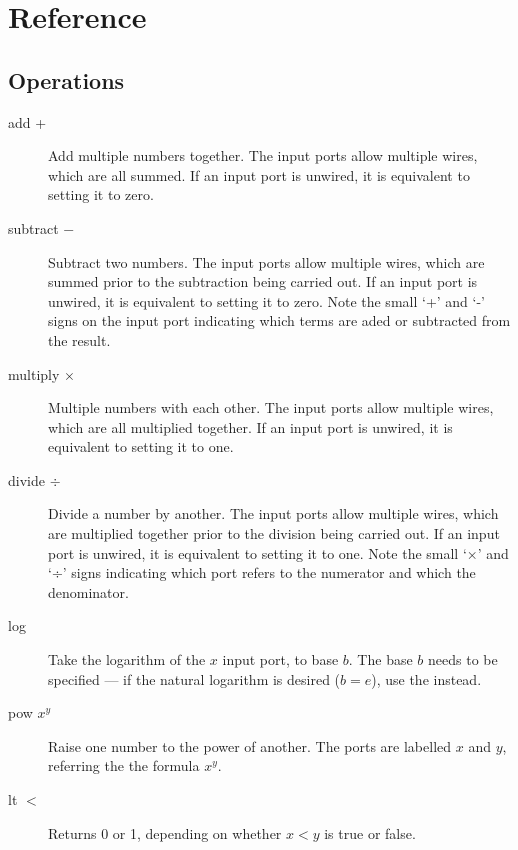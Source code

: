 \chapter{Reference}

\section{Operations}\label{operations}

\begin{description}

\item[add +]\label{op:add} Add multiple numbers together. The input ports allow
multiple wires, which are all summed. If an input port is unwired, it
is equivalent to setting it to zero.

\item[subtract $-$]\label{op:subtract} Subtract two numbers. The input ports
allow multiple wires, which are summed prior to the subtraction being
carried out. If an input port is unwired, it is equivalent to setting
it to zero. Note the small `+' and `-' signs on the input port
indicating which terms are aded or subtracted from the result.

\item[multiply $\times$]\label{op:multiply} Multiple numbers with each other. The input ports
allow multiple wires, which are all multiplied together. If an input
port is unwired, it is equivalent to setting it to one.

\item[divide $\div$]\label{op:divide} Divide a number by another. The input ports allow
multiple wires, which are multiplied together prior to the division
being carried out. If an input port is unwired, it is equivalent to
setting it to one. Note the small `×' and `÷' signs indicating which
port refers to the numerator and which the denominator.

\item[log]\label{op:log} Take the logarithm of the $x$ input port, to
base $b$. The base $b$ needs to be specified --- if the natural
logarithm is desired ($b=e$), use the  instead.

\item[pow $x^y$]\label{op:pow} Raise one number to the power of another. The
ports are labelled $x$ and $y$, referring the the formula $x^y$.

\item[lt $<$]\label{op:lt} Returns 0 or 1, depending
  on whether $x<y$ is true or false.


\end{description}
